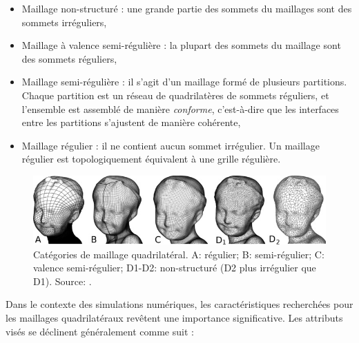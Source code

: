  \begin{itemize}
    \item Maillage non-structuré : une grande partie des sommets du maillages sont des sommets irréguliers,\\
    \item Maillage à valence semi-régulière : la plupart des sommets du maillage sont des sommets réguliers,\\
    \item Maillage semi-régulière : il s'agit d'un maillage formé de plusieurs partitions. Chaque partition est un réseau de quadrilatères de sommets réguliers, et l'ensemble est assemblé de manière \emph{conforme}, c'est-à-dire que les interfaces entre les partitions s'ajustent de manière cohérente,\\
    \item Maillage régulier :  il ne contient aucun sommet irrégulier. Un maillage régulier est topologiquement équivalent à une grille régulière.\\
 \end{itemize}
 
\begin{figure}[!h]
    \centering
    \includegraphics[scale=5.2]{images/Quad_meshes_categories.png}
    \caption{Catégories de maillage quadrilatéral. A: régulier; B: semi-régulier; C: valence semi-régulier; D1-D2: non-structuré (D2 plus irrégulier que D1). Source: \cite{bommes2013quad}.}
    \label{fig:Quad_meshes_categories}
\end{figure}


Dans le contexte des simulations numériques, les caractéristiques recherchées pour les maillages quadrilatéraux revêtent une importance significative. Les attributs visés se déclinent généralement comme suit :\\

